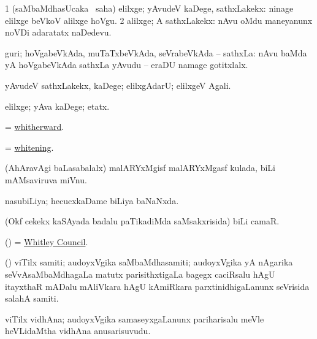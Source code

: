\bentry
{} 
\gl{\saMavayx}
\bmng
\bnum
\num{1} (saMbaMdhasUcaka \kirxvi\ saha) elilxge; yAvudeV kaDege, sathxLakekx:  ninage elilxge beVkoV alilxge hoVgu. 
\num{2} alilxge; A sathxLakekx:  nAvu oMdu maneyanunx noVDi adaratatx naDedevu. 
\enum
\emng
\eentry

\bentry
{} 
\gl{\nA}
\expl{}
\bmng
guri; hoVgabeVkAda, muTaTxbeVkAda, seVrabeVkAda -- sathxLa:  nAvu baMda yA hoVgabeVkAda sathxLa yAvudu -- eraDU namage gotitxlalx. 
\emng
\eentry

\bentry
{} 
\expl{(\pArxparx)}
\bmng
 yAvudeV sathxLakekx, kaDege; elilxgAdarU; elilxgeV Agali. 
\emng
\eentry

\bentry
{}
\gl{\kirxvi}
\bmng
elilxge; yAva kaDege; etatx. 
\emng
\eentry

\bentry
{}
\gl{\kirxvi}
\bmng
= \hyperlink{whitherward}{whitherward}. 
\emng
\eentry

\bentry
{} 
\gl{\nA}
\expl{}
\bmng
= \hyperlink{whitening}{whitening}. 
\emng
\eentry

\bentry
{} 
\gl{\nA}
\expl{}
\bmng
(AhAravAgi baLasabalalx) malARYxMgisf malARYxMgasf kulada, biLi mAMsaviruva miVnu. 
\emng
\eentry

\bentry
{}
\gl{\gu}
\bmng
nasubiLiya; hecucxkaDame biLiya baNaNxda. 
\emng
\eentry

\bentry
{}
\gl{\nA}
\bmng
(Okf cekekx kaSAyada badalu paTikadiMda saMsakxrisida) biLi camaR. 
\emng
\eentry

\bentry
{} 
\gl{\nA}
\bmng
(\birx) = \hyperlink{Whitley Council}{Whitley Council}. 
\emng
\eentry

\bentry
{}
\gl{\nA}
\bmng
(\birx) viTilx samiti; audoyxVgika saMbaMdhasamiti; audoyxVgika yA nAgarika seVvAsaMbaMdhagaLa matutx parisithxtigaLa bagegx caciRsalu hAgU itayxthaR mADalu mAliVkara hAgU kAmiRkara parxtinidhigaLanunx seVrisida salahA samiti. 
\emng
\eentry

\bentry
{} 
\gl{\nA}
\expl{}
\bmng
viTilx vidhAna; audoyxVgika samaseyxgaLanunx pariharisalu meVle heVLidaMtha vidhAna anusarisuvudu. 
\emng
\eentry

